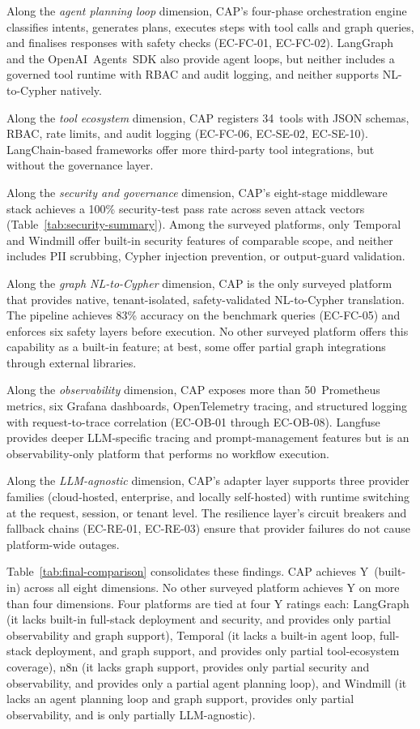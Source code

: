 \documentclass[a4paper]{sapthesis}
\begin{document}
Along the \emph{agent planning loop} dimension, CAP's four-phase
orchestration engine classifies intents, generates plans, executes steps
with tool calls and graph queries, and finalises responses with safety
checks (EC-FC-01, EC-FC-02).  LangGraph and the OpenAI~Agents~SDK also
provide agent loops, but neither includes a governed tool runtime with
RBAC and audit logging, and neither supports NL-to-Cypher natively.

Along the \emph{tool ecosystem} dimension, CAP registers 34~tools with
JSON schemas, RBAC, rate limits, and audit logging (EC-FC-06, EC-SE-02,
EC-SE-10).  LangChain-based frameworks offer more third-party tool
integrations, but without the governance layer.

Along the \emph{security and governance} dimension, CAP's eight-stage
middleware stack achieves a 100\% security-test pass rate across seven
attack vectors (Table~\ref{tab:security-summary}).  Among the surveyed
platforms, only Temporal and Windmill offer built-in security features
of comparable scope, and neither includes PII scrubbing, Cypher injection
prevention, or output-guard validation.

Along the \emph{graph NL-to-Cypher} dimension, CAP is the only surveyed
platform that provides native, tenant-isolated, safety-validated
NL-to-Cypher translation.  The pipeline achieves 83\% accuracy on
the benchmark queries (EC-FC-05) and enforces six safety layers before
execution.  No other surveyed platform offers this capability as a
built-in feature; at best, some offer partial graph integrations through
external libraries.

Along the \emph{observability} dimension, CAP exposes more than
50~Prometheus metrics, six Grafana dashboards, OpenTelemetry tracing,
and structured logging with request-to-trace correlation (EC-OB-01
through EC-OB-08).  Langfuse provides deeper LLM-specific tracing and
prompt-management features but is an observability-only platform that
performs no workflow execution.

Along the \emph{LLM-agnostic} dimension, CAP's adapter layer supports
three provider families (cloud-hosted, enterprise, and locally
self-hosted) with runtime switching at the request, session, or tenant
level.  The resilience layer's circuit breakers and fallback chains
(EC-RE-01, EC-RE-03) ensure that provider failures do not cause
platform-wide outages.

Table~\ref{tab:final-comparison} consolidates these findings.  CAP
achieves Y~(built-in) across all eight dimensions.  No other surveyed
platform achieves Y on more than four dimensions.  Four platforms are
tied at four Y ratings each: LangGraph (it lacks built-in full-stack
deployment and security, and provides only partial observability and
graph support), Temporal (it lacks a built-in agent loop, full-stack
deployment, and graph support, and provides only partial tool-ecosystem
coverage), n8n (it lacks graph support, provides only partial
security and observability, and provides only a partial agent planning
loop), and Windmill (it lacks an agent planning loop and graph
support, provides only partial observability, and is only partially
LLM-agnostic).
\end{document}
